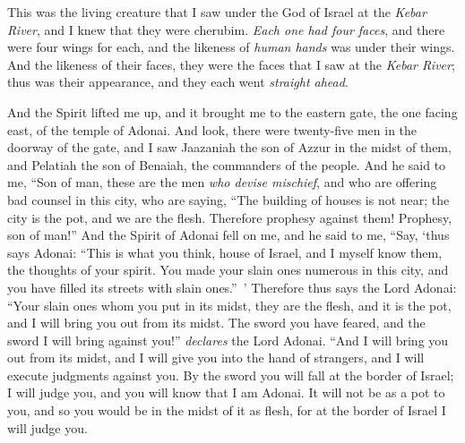 \begin{biblechapter}
\verse This was the living creature that I saw under the God of Israel at the \textit{Kebar River}, and I knew that they were cherubim.
\verse \textit{Each one had four faces}, and there were four wings for each, and the likeness of \textit{human hands} was under their wings.
\verse And the likeness of their faces, they were the faces that I saw at the \textit{Kebar River}; thus was their appearance, and they each went \textit{straight ahead}.
\end{biblechapter}

\begin{biblechapter} %
 And the Spirit lifted me up, and it brought me to the eastern gate, the one facing east, of the temple of Adonai. And look, there were twenty-five men in the doorway of the gate, and I saw Jaazaniah the son of Azzur in the midst of them, and Pelatiah the son of Benaiah, the commanders of the people.
\verse And he said to me, “Son of man, these are the men \textit{who devise mischief}, and who are offering bad counsel in this city,
\verse who are saying, “The building of houses is not near; the city is the pot, and we are the flesh.
\verse Therefore prophesy against them! Prophesy, son of man!”
\verse And the Spirit of Adonai fell on me, and he said to me, “Say, ‘thus says Adonai: “This is what you think, house of Israel, and I myself know them, the thoughts of your spirit.
\verse You made your slain ones numerous in this city, and you have filled its streets with slain ones.” ’
\verse Therefore thus says the Lord Adonai: “Your slain ones whom you put in its midst, they are the flesh, and it is the pot, and I will bring you out from its midst.
\verse The sword you have feared, and the sword I will bring against you!” \textit{declares} the Lord Adonai.
\verse “And I will bring you out from its midst, and I will give you into the hand of strangers, and I will execute judgments against you.
\verse By the sword you will fall at the border of Israel; I will judge you, and you will know that I am Adonai.
\verse It will not be as a pot to you, and so you would be in the midst of it as flesh, for at the border of Israel I will judge you.

\end{biblechapter}
